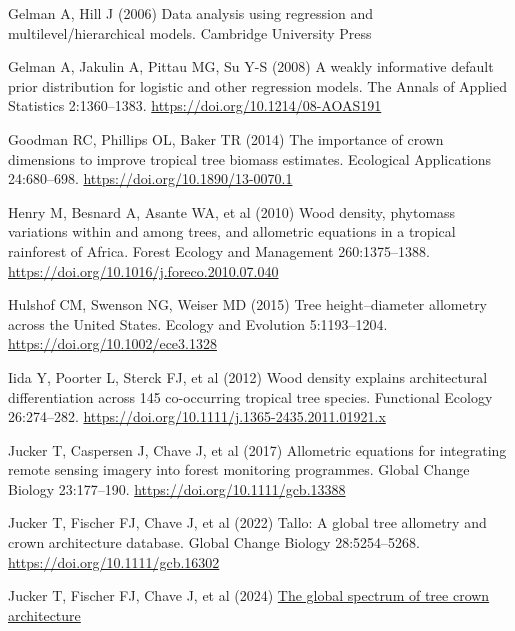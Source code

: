 \documentclass[
  12pt,
  letterpaper,
  DIV=11,
  numbers=noendperiod]{scrartcl}
\newlength{\cslhangindent}
\newlength{\cslentryspacingunit} %
\newenvironment{CSLReferences}[2] %
 {%
  \setlength{\parindent}{0pt}
  \ifodd #1
  \let\oldpar\par
  \def\par{\hangindent=\cslhangindent\oldpar}
  \fi
  \setlength{\parskip}{#2\cslentryspacingunit}
 }%
 {}
\begin{document}
\begin{CSLReferences}{1}{0}
\leavevmode{}%
Gelman A, Hill J (2006) Data analysis using regression and
multilevel/hierarchical models. Cambridge University Press

\leavevmode{}%
Gelman A, Jakulin A, Pittau MG, Su Y-S (2008) A weakly informative
default prior distribution for logistic and other regression models. The
Annals of Applied Statistics 2:1360--1383.
\url{https://doi.org/10.1214/08-AOAS191}

\leavevmode{}%
Goodman RC, Phillips OL, Baker TR (2014) The importance of crown
dimensions to improve tropical tree biomass estimates. Ecological
Applications 24:680--698. \url{https://doi.org/10.1890/13-0070.1}

\leavevmode{}%
Henry M, Besnard A, Asante WA, et al (2010) Wood density, phytomass
variations within and among trees, and allometric equations in a
tropical rainforest of {Africa}. Forest Ecology and Management
260:1375--1388. \url{https://doi.org/10.1016/j.foreco.2010.07.040}

\leavevmode{}%
Hulshof CM, Swenson NG, Weiser MD (2015) Tree height--diameter allometry
across the {United} {States}. Ecology and Evolution 5:1193--1204.
\url{https://doi.org/10.1002/ece3.1328}

\leavevmode{}%
Iida Y, Poorter L, Sterck FJ, et al (2012) Wood density explains
architectural differentiation across 145 co-occurring tropical tree
species. Functional Ecology 26:274--282.
\url{https://doi.org/10.1111/j.1365-2435.2011.01921.x}

\leavevmode{}%
Jucker T, Caspersen J, Chave J, et al (2017) Allometric equations for
integrating remote sensing imagery into forest monitoring programmes.
Global Change Biology 23:177--190.
\url{https://doi.org/10.1111/gcb.13388}

\leavevmode{}%
Jucker T, Fischer FJ, Chave J, et al (2022) Tallo: {A} global tree
allometry and crown architecture database. Global Change Biology
28:5254--5268. \url{https://doi.org/10.1111/gcb.16302}

\leavevmode{}%
Jucker T, Fischer FJ, Chave J, et al (2024)
\href{https://doi.org/10.1101/2024.09.14.613032}{The global spectrum of
tree crown architecture}


\end{CSLReferences}
\end{document}
